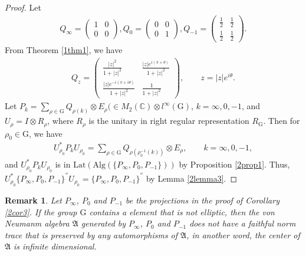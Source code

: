 \documentclass{amsart}
\newcommand{\AAA}{\mathfrak A}
\newcommand{\Lat}{\mathrm{Lat}}
\newcommand{\Alg}{\mathrm{Alg}}
\newcommand{\C}{\mathbb C} %
\newtheorem{remark}{Remark}[section]
\begin{document}
\begin{proof}
Let 
\begin{align*}
Q_{\infty} = \left(\begin{array}{cc}1 & 0 \\0 & 0\end{array}\right),
Q_{0} = \left(\begin{array}{cc}0 & 0 \\0 & 1\end{array}\right),
Q_{-1} = \left(\begin{array}{cc}\frac{1}{2} & \frac{1}{2}  \\ \frac{1}{2}  & \frac{1}{2} \end{array}\right).
\end{align*}
From Theorem \ref{1thm1}, we have 
\begin{align*}
Q_{z} = \left(\begin{array}{cc}\frac{|z|^{2}}{1 + |z|^2} & \frac{|z|e^{i(\pi + \theta)}}{1 + |z|^2}  \\ 
 \frac{|z|e^{-i(\pi + i\theta)}}{1 + |z|^2} & \frac{1}{1 + |z|^2}\end{array}\right), \qquad z = |z|e^{i\theta}.
\end{align*}
Let $P_{k} = \sum_{\rho \in \mathrm{G}}Q_{\rho(k)} \otimes E_{\rho} (\in M_{2}(\C) \otimes l^{\infty}(\mathrm{G})$, $k = \infty, 0, -1$, and $U_{\rho} = I \otimes R_{\rho}$, where $R_{\rho}$ is the unitary in right regular representation $R_{\mathrm{G}}$. Then for $\rho_{0} \in \mathrm{G}$, we have 
\begin{align*}
U^{*}_{\rho_{0}} P_{k} U_{\rho_{0}} = \sum_{\rho \in \mathrm{G}}Q_{\rho(\rho^{-1}_{0}(k))} \otimes E_{\rho}, \qquad k = \infty, 0, -1,
\end{align*}
and $U^{*}_{\rho_{0}} P_{k} U_{\rho_{0}} $ is in $\Lat(\Alg( \{ P_{\infty}, P_{0}, P_{-1} \}))$ by Proposition \ref{2prop1}.
Thus, $U^{*}_{\rho_{0}} \{P_{\infty}, P_{0}, P_{-1} \}^{''} U_{\rho_{0}} =   \{P_{\infty}, P_{0}, P_{-1} \}^{''}$ by Lemma
\ref{2lemma3}.
\end{proof}

\begin{remark}
Let $P_{\infty}$, $P_{0}$ and $P_{-1}$ be the projections in the proof of Corollary \ref{2cor3}. If the 
group $\mathrm{G}$ contains a element that is not elliptic, then the von Neumanm algebra $\AAA$
generated by $P_{\infty}$, $P_{0}$ and $P_{-1}$ does not have a faithful norm trace that is preserved by
any automorphisms of $\AAA$, in another word, the center of $\AAA$ is infinite dimensional.  
\end{remark}
\end{document}
